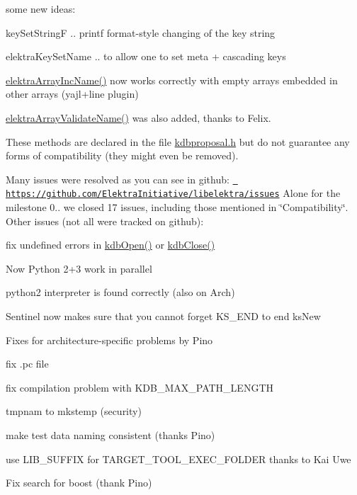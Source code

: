 some new ideas\+:


\begin{DoxyItemize}
\item {\ttfamily key\+Set\+StringF} .. printf format-\/style changing of the key string
\item {\ttfamily elektra\+Key\+Set\+Name} .. to allow one to set meta + cascading keys
\end{DoxyItemize}

{\ttfamily \mbox{\hyperlink{array_8c_afc46476b8d722d89e07a966e023df317}{elektra\+Array\+Inc\+Name()}}} now works correctly with empty arrays embedded in other arrays (yajl+line plugin)

{\ttfamily \mbox{\hyperlink{array_8c_ac97baa33fb7b7e83192e156827ba2eb5}{elektra\+Array\+Validate\+Name()}}} was also added, thanks to Felix.

These methods are declared in the file {\ttfamily \mbox{\hyperlink{kdbproposal_8h}{kdbproposal.\+h}}} but do not guarantee any forms of compatibility (they might even be removed).

Many issues were resolved as you can see in github\+: \href{https://github.com/ElektraInitiative/libelektra/issues}{\texttt{ https\+://github.\+com/\+Elektra\+Initiative/libelektra/issues}} Alone for the milestone 0.. we closed 17 issues, including those mentioned in \char`\"{}\+Compatibility\char`\"{}. Other issues (not all were tracked on github)\+:


\begin{DoxyItemize}
\item fix undefined errors in {\ttfamily \mbox{\hyperlink{group__kdb_ga6808defe5870f328dd17910aacbdc6ca}{kdb\+Open()}}} or {\ttfamily \mbox{\hyperlink{group__kdb_gadb54dc9fda17ee07deb9444df745c96f}{kdb\+Close()}}}
\item Now Python 2+3 work in parallel
\item python2 interpreter is found correctly (also on Arch)
\item Sentinel now makes sure that you cannot forget {\ttfamily K\+S\+\_\+\+E\+ND} to end {\ttfamily ks\+New}
\item Fixes for architecture-\/specific problems by Pino
\item fix .pc file
\item fix compilation problem with {\ttfamily K\+D\+B\+\_\+\+M\+A\+X\+\_\+\+P\+A\+T\+H\+\_\+\+L\+E\+N\+G\+TH}
\item tmpnam to mkstemp (security)
\item make test data naming consistent (thanks Pino)
\item use {\ttfamily L\+I\+B\+\_\+\+S\+U\+F\+F\+IX for T\+A\+R\+G\+E\+T\+\_\+\+T\+O\+O\+L\+\_\+\+E\+X\+E\+C\+\_\+\+F\+O\+L\+D\+ER} thanks to Kai Uwe
\item Fix search for boost (thank Pino)
\end{DoxyItemize}

